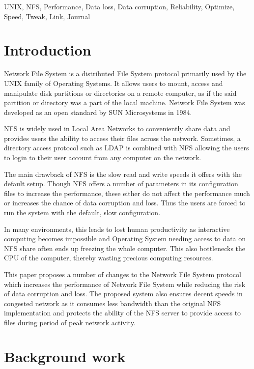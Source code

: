 \documentclass[conference]{IEEEtran}
\begin{document}
\begin{IEEEkeywords}
UNIX, NFS, Performance, Data loss, Data corruption, Reliability, Optimize, Speed, Tweak, Link, Journal
\end{IEEEkeywords}

\section{Introduction}
Network File System is a distributed File System protocol primarily used by the UNIX family of Operating Systems. It allows users to mount, access and manipulate disk partitions or directories on a remote computer, as if the said partition or directory was a part of the local machine. Network File System was developed as an open standard by SUN Microsystems in 1984.

NFS is widely used in Local Area Networks to conveniently share data and provides users the ability to access their files across the network. Sometimes, a directory access protocol such as LDAP is combined with NFS allowing the users to login to their user account from any computer on the  network.

The main drawback of NFS is the slow read and write speeds it offers with the default setup. Though NFS offers a number of parameters in its configuration files to  increase the performance, these either do not affect the performance much or increases the chance of data corruption and loss. Thus the users are forced to run the system with the default, slow configuration.

In many environments, this leads to lost human productivity as interactive computing becomes impossible and Operating System needing access to data on NFS share often ends up freezing the whole computer. This also bottlenecks the CPU of the computer, thereby wasting precious computing resources.

This paper proposes a number of changes to the Network File System protocol which increases the performance of Network File System while reducing the risk of data corruption and loss. The proposed system also ensures
decent speeds in congested network as it consumes less bandwidth than the original NFS implementation and protects the ability of the NFS server to provide access to files during period of peak network activity.

\section{Background work}
\end{document}
